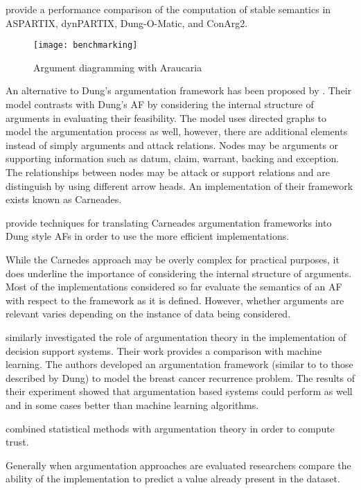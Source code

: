 \cite{bistarelli2013first} provide a performance comparison of the computation of stable semantics in ASPARTIX, dynPARTIX, Dung-O-Matic, and ConArg2.


\begin{figure}[!h]
\centering
\texttt{[image: benchmarking]}
\caption{Argument diagramming with Araucaria}
\label{fig:my_label}
\end{figure}


An alternative to Dung's argumentation framework has been proposed by \cite{gordon2007carneades}.
Their model contrasts with Dung's AF by considering the internal structure of arguments in evaluating their feasibility. The model uses directed graphs to model the argumentation process as well, however, there are additional elements instead of simply arguments and attack relations. Nodes may be arguments or supporting information such as datum, claim, warrant, backing and exception. The relationships between nodes may be attack or support relations and are distinguish by using different arrow heads. An implementation of their framework exists known as Carneades.

\cite{van2014principled} provide techniques for translating Carneades argumentation frameworks into Dung style AFs in order to use the more efficient implementations.

While the Carnedes approach may be overly complex for practical purposes, it does underline the importance of considering the internal structure of arguments. Most of the implementations considered so far evaluate the semantics of an AF with respect to the framework as it is defined. However, whether arguments are relevant varies depending on the instance of data being considered.

\cite{longo2012argumentation} similarly investigated the role of argumentation theory in the implementation of decision support systems. Their work provides a comparison with machine learning. The authors developed an argumentation framework (similar to to those described by Dung) to model the breast cancer recurrence problem. The results of their experiment showed that argumentation based systems could perform as well and in some cases better than machine learning algorithms.

\cite{matt2010combining} combined statistical methods with argumentation theory in order to compute trust.

Generally when argumentation approaches are evaluated researchers compare the ability of the implementation to predict a value already present in the dataset. 


